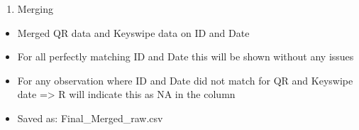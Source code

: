 \documentclass[
]{book}
\providecommand{\tightlist}{%
  \setlength{\itemsep}{0pt}\setlength{\parskip}{0pt}}
\begin{document}
\begin{enumerate}
\def\labelenumi{\alph{enumi}.}
\setcounter{enumi}{2}
\tightlist
\item
  Merging
\end{enumerate}

\begin{itemize}
\tightlist
\item
  Merged QR data and Keyswipe data on ID and Date
\item
  For all perfectly matching ID and Date this will be shown without any issues
\item
  For any observation where ID and Date did not match for QR and Keyswipe date =\textgreater{} R will indicate this as NA in the column
\item
  Saved as: Final\_Merged\_raw.csv
\end{itemize}
\end{document}
